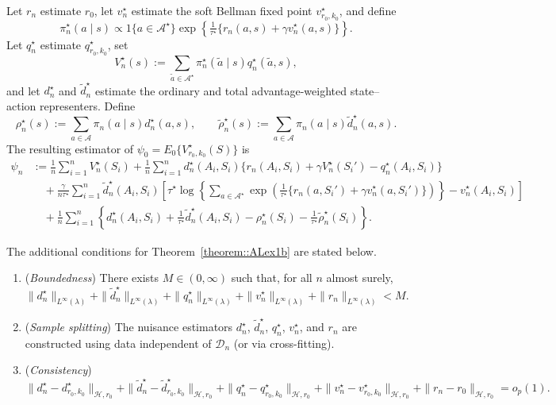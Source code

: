 \documentclass[11pt]{article}
\theoremstyle{plain}
\begin{document}
Let \(r_n\) estimate \(r_0\), let \(v_n^\star\) estimate the soft Bellman
fixed point \(v_{r_0,k_0}^\star\), and define
\[
\pi_n^\star(a\mid s)
\propto
1\{a\in\mathcal A^\star\}
\exp\!\left\{
\tfrac{1}{\tau^\star}\{r_n(a,s)+\gamma v_n^\star(a,s)\}
\right\}.
\]
Let \(q_n^\star\) estimate \(q_{r_0,k_0}^\star\), set
\[
V_n^\star(s)
:=
\sum_{\tilde a\in\mathcal A^\star}
\pi_n^\star(\tilde a\mid s)q_n^\star(\tilde a,s),
\]
and let \(d_n^\star\) and \(\widetilde d_n^\star\) estimate the ordinary and
total advantage-weighted state--action representers. Define
\[
\rho_n^\star(s):=\sum_{a\in\mathcal A}\pi_n(a\mid s)d_n^\star(a,s),
\qquad
\widetilde\rho_n^\star(s)
:=\sum_{a\in\mathcal A}\pi_n(a\mid s)\widetilde d_n^\star(a,s).
\]
The resulting estimator of \(\psi_0=E_0\{V_{r_0,k_0}^\star(S)\}\) is
\begin{align*}
\psi_n
&:=
\frac{1}{n}\sum_{i=1}^n V_n^\star(S_i)
+
\frac{1}{n}\sum_{i=1}^n
d_n^\star(A_i,S_i)
\{r_n(A_i,S_i)+\gamma V_n^\star(S_i')-q_n^\star(A_i,S_i)\}
\\
&\quad+
\frac{\gamma}{n\tau^\star}\sum_{i=1}^n
\widetilde d_n^\star(A_i,S_i)
\left[
\tau^\star
\log\!\left\{
\sum_{a\in\mathcal A^\star}
\exp\!\left(
\tfrac{1}{\tau^\star}\{r_n(a,S_i')+\gamma v_n^\star(a,S_i')\}
\right)
\right\}
-
v_n^\star(A_i,S_i)
\right]
\\
&\quad+
\frac{1}{n}\sum_{i=1}^n
\left\{
 d_n^\star(A_i,S_i)
 +\tfrac{1}{\tau^\star}\widetilde d_n^\star(A_i,S_i)
 -\rho_n^\star(S_i)
 -\tfrac{1}{\tau^\star}\widetilde\rho_n^\star(S_i)
\right\}.
\end{align*}

The additional conditions for Theorem~\ref{theorem::ALex1b} are stated below.
\begin{enumerate}[label=\textbf{(E\arabic**)}, ref=E\arabic**, resume = efficiency1b]
    \item \label{assump:boundedness::softstar}(\textit{Boundedness})
    There exists $M \in (0,\infty)$ such that, for all $n$ almost surely,
    \[
      \|d_n^\star\|_{L^\infty(\lambda)}
      + \|\widetilde d_n^\star\|_{L^\infty(\lambda)}
      + \|q_n^\star\|_{L^\infty(\lambda)}
      + \|v_n^\star\|_{L^\infty(\lambda)}
      + \|r_n\|_{L^\infty(\lambda)}
      < M.
    \]

    \item \label{assump:splitting::softstar}(\textit{Sample splitting})
    The nuisance estimators $d_n^\star$, $\widetilde d_n^\star$, $q_n^\star$, $v_n^\star$, and $r_n$
    are constructed using data independent of $\mathcal{D}_n$ (or via cross-fitting).

    \item \label{assump:consistency::softstar}(\textit{Consistency})
    \[
      \|d_n^\star - d_{r_0,k_0}^\star\|_{\mathcal H,r_0}
      + \|\widetilde d_n^\star - \widetilde d_{r_0,k_0}^\star\|_{\mathcal H,r_0}
      + \|q_n^\star - q_{r_0,k_0}^\star\|_{\mathcal{H},r_0}
      + \|v_n^\star - v_{r_0,k_0}^\star\|_{\mathcal{H},r_0}
      + \|r_n - r_0\|_{\mathcal{H},r_0}
      = o_p(1).
    \]
\end{enumerate}
\end{document}
